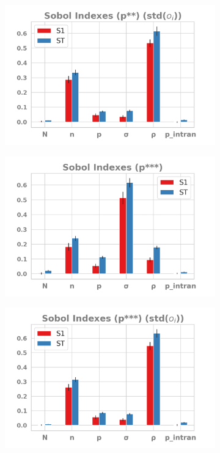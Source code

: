\documentclass{article}
\begin{document}
{\begin{figure}[H]
\begin{subfigure}[b]{0.48\textwidth}
     \end{subfigure}
    \begin{subfigure}[b]{0.48\textwidth}
      \includegraphics[width=\textwidth]{img/sobolpstar2-measurestd.png}
     \end{subfigure}
     \begin{subfigure}[b]{0.48\textwidth}
       \includegraphics[width=\textwidth]{img/sobolpstar3.png}
     \end{subfigure}
     \begin{subfigure}[b]{0.48\textwidth}
       \includegraphics[width=\textwidth]{img/sobolpstar3-measurestd.png}

\end{subfigure}
\end{figure}}
\end{document}
